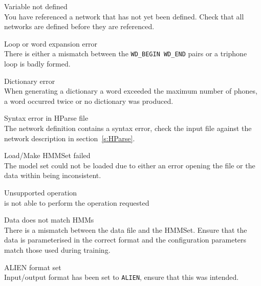 \begin{itemize}

\begin{itemize}
 Variable not defined\\
        You have referenced a network that has not yet been defined.  Check 
        that all networks are defined before they are referenced.

 Loop or word expansion error\\
        There is either a mismatch between the \texttt{WD\_BEGIN WD\_END} 
        pairs or a triphone loop is badly formed.

 Dictionary error\\
        When generating a dictionary a word exceeded the maximum number of 
        phones, a word occurred twice or no dictionary was produced.

 Syntax error in HParse file\\
        The  network definition contains a syntax error, check 
        the input file against the network description in 
        section~\ref{s:HParse}.

\end{itemize}


\begin{itemize}

    Load/Make HMMSet failed\\
        The model set could not be loaded due to either an error opening the
        file or the data within being inconsistent.

 Unsupported operation\\
         is not able to perform the operation requested

 Data does not match HMMs\\
        There is a mismatch between the data file and the HMMSet.  Ensure that
        the data is parameterised in the correct format and the configuration
        parameters match those used during training.

    ALIEN format set\\
        Input/output format has been set to \texttt{ALIEN}, ensure that 
        this was intended.

\end{itemize}



\end{itemize}
